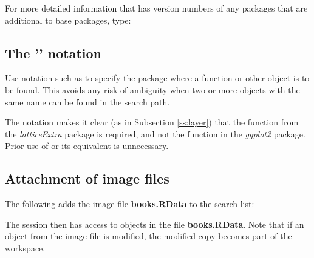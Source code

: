 For more detailed information that has version numbers of any packages
that are additional to base packages, type:
\begin{knitrout}
\color{fgcolor}\begin{kframe}
\begin{alltt}
\hlstd{()}
\end{alltt}
\end{kframe}
\end{knitrout}

\subsection*{The '\code{::}' notation}
Use notation such as  to specify the package
where a function or other object is to be found.  This avoids any
risk of ambiguity when two or more objects with the same name can
be found in the search path.

The notation  
makes it clear (as in Subsection \ref{ss:layer}) that the function
 from the {\em latticeExtra} package is required, 
and not the function  in the {\em ggplot2} package.
Prior use of  or its equivalent is
unnecessary.

\subsection*{Attachment of image files}
The following adds the image file \textbf{books.RData} to the search list:
\begin{knitrout}
\color{fgcolor}\begin{kframe}
\begin{alltt}
\hlstd{(}\hlstd{)}
\end{alltt}
\end{kframe}
\end{knitrout}
\noindent
The session then has access to objects in the file
\textbf{books.RData}.
  Note that if an object from the image file is modified,
the modified copy becomes part of the workspace.

